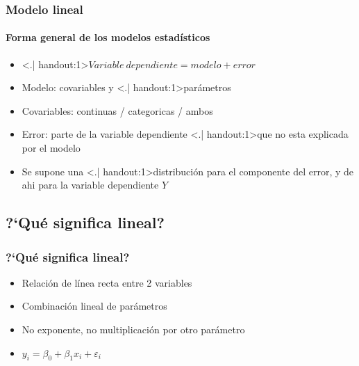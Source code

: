 \documentclass[mathserif]{beamer}
\begin{document}
 
\begin{frame}[label=linmodel2]
   \frametitle{Modelo lineal}
   \framesubtitle{Forma general de los modelos estad\'isticos}
    \begin{itemize}[<+- | visible@+-| handout:1>]
      \item \alert<.| handout:1>{$Variable~dependiente = modelo + error$}
      \medskip
      \item Modelo: covariables y \structure<.| handout:1>{par\'ametros}
      \item Covariables: continuas / categoricas / ambos
      \item Error: parte de la variable dependiente \structure<.| handout:1>{que no esta explicada} por el modelo
      \medskip
      \item Se supone una \structure<.| handout:1>{distribuci\'on} para el componente del error, y de ahi para la variable dependiente $Y$
   \end{itemize}
\end{frame}%


\subsection[?`Lineal?]{?`Qu\'e significa lineal?}
  
\begin{frame}[label=signilineal]
   \frametitle{?`Qu\'e significa lineal?}
    \begin{itemize}[<+-| visible@+-| handout:1>]
      \item Relaci\'on de l\'inea recta entre 2 variables
      \item Combinaci\'on lineal de par\'ametros 
      \item No exponente, no multiplicaci\'on por otro par\'ametro
      \item $y_i=\beta_0+\beta_1 x_i+\varepsilon_i$
   \end{itemize}
\end{frame}%
\end{document}
